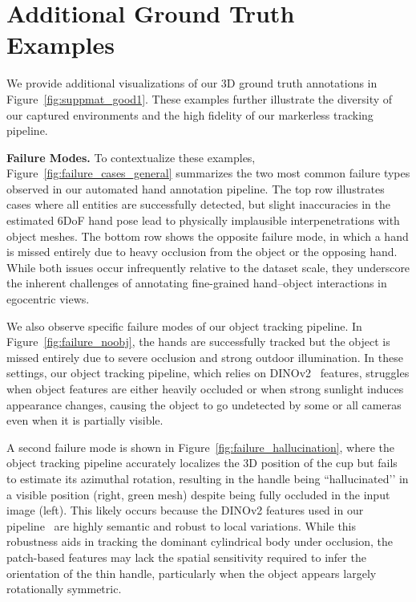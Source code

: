 \documentclass[10pt,twocolumn,letterpaper]{article}
\begin{document}
\section{Additional Ground Truth Examples}

We provide additional visualizations of our 3D ground truth annotations in Figure~\ref{fig:suppmat_good1}. 
These examples further illustrate the diversity of our captured environments and the high fidelity of our markerless tracking pipeline. 

\textbf{Failure Modes.} To contextualize these examples, Figure~\ref{fig:failure_cases_general} summarizes the two most common failure types observed in our automated hand annotation pipeline. The top row illustrates cases where all entities are successfully detected, but slight inaccuracies in the estimated 6DoF hand pose lead to physically implausible interpenetrations with object meshes. The bottom row shows the opposite failure mode, in which a hand is missed entirely due to heavy occlusion from the object or the opposing hand. While both issues occur infrequently relative to the dataset scale, they underscore the inherent challenges of annotating fine-grained hand–object interactions in egocentric views.

We also observe specific failure modes of our object tracking pipeline. In Figure~\ref{fig:failure_noobj}, the hands are successfully tracked but the object is missed entirely due to severe occlusion and strong outdoor illumination. In these settings, our object tracking pipeline, which relies on DINOv2~\cite{oquab2023dinov2} features, struggles when object features are either heavily occluded or when strong sunlight induces appearance changes, causing the object to go undetected by some or all cameras even when it is partially visible.

A second failure mode is shown in Figure~\ref{fig:failure_hallucination}, where the object tracking pipeline accurately localizes the 3D position of the cup but fails to estimate its azimuthal rotation, resulting in the handle being “hallucinated’’ in a visible position (right, green mesh) despite being fully occluded in the input image (left). This likely occurs because the DINOv2 features used in our pipeline~\cite{nguyen2023cnos, ornek2024foundpose, nguyen2025gotrack} are highly semantic and robust to local variations. While this robustness aids in tracking the dominant cylindrical body under occlusion, the patch-based features may lack the spatial sensitivity required to infer the orientation of the thin handle, particularly when the object appears largely rotationally symmetric.

{
    \small
    
    
}
\end{document}
